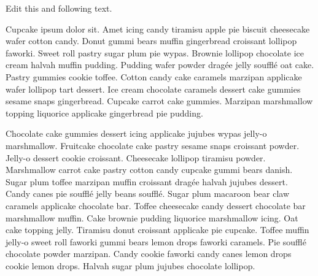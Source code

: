 \documentclass[12pt]{article} %
\begin{document}
\setlength{\pdfpageheight}{\paperheight}
\setlength{\pdfpagewidth}{\paperwidth}
\setlength{\parindent}{0pt} %
\setlength{\parskip}{2ex} %

Edit this and following text.

Cupcake ipsum dolor sit.
Amet icing candy tiramisu apple pie biscuit cheesecake wafer cotton candy. Donut gummi bears muffin gingerbread croissant lollipop faworki. Sweet roll pastry sugar plum pie wypas. Brownie lollipop chocolate ice cream halvah muffin pudding. Pudding wafer powder dragée jelly soufflé oat cake. Pastry gummies cookie toffee.
Cotton candy cake caramels marzipan applicake wafer lollipop tart dessert. Ice cream chocolate caramels dessert cake gummies sesame snaps gingerbread. Cupcake carrot cake gummies. Marzipan marshmallow topping liquorice applicake gingerbread pie pudding.

Chocolate cake gummies dessert icing applicake jujubes wypas jelly-o marshmallow. Fruitcake chocolate cake pastry sesame snaps croissant powder.
Jelly-o dessert cookie croissant. Cheesecake lollipop tiramisu powder. Marshmallow carrot cake pastry cotton candy cupcake gummi bears danish. Sugar plum toffee marzipan muffin croissant dragée halvah jujubes dessert.
Candy canes pie soufflé jelly beans soufflé. Sugar plum macaroon bear claw caramels applicake chocolate bar.
Toffee cheesecake candy dessert chocolate bar marshmallow muffin. Cake brownie pudding liquorice marshmallow icing. Oat cake topping jelly. Tiramisu donut croissant applicake pie cupcake. Toffee muffin jelly-o sweet roll faworki gummi bears lemon drops faworki caramels. Pie soufflé chocolate powder marzipan. Candy cookie faworki candy canes lemon drops cookie lemon drops.
Halvah sugar plum jujubes chocolate lollipop.
\end{document}
